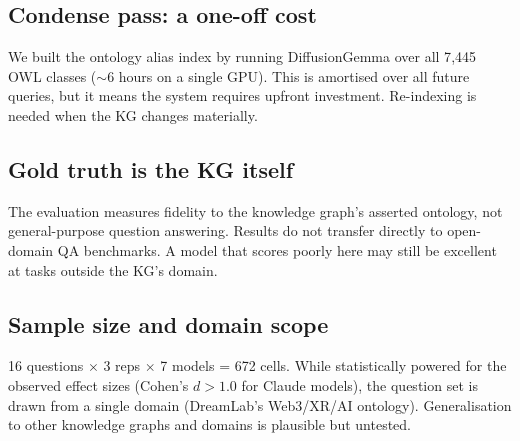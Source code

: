 \documentclass[11pt]{article}
\begin{document}
\begin{samepage}
\subsection{Condense pass: a one-off cost}
We built the ontology alias index by running DiffusionGemma over all 7{,}445 OWL classes
($\sim$6 hours on a single GPU). This is amortised over all future queries, but it means the
system requires upfront investment. Re-indexing is needed when the KG changes materially.
\end{samepage}

\begin{samepage}
\subsection{Gold truth is the KG itself}
The evaluation measures fidelity to the knowledge graph's asserted ontology, not general-purpose
question answering. Results do not transfer directly to open-domain QA benchmarks. A model that
scores poorly here may still be excellent at tasks outside the KG's domain.
\end{samepage}

\begin{samepage}
\subsection{Sample size and domain scope}
16 questions $\times$ 3 reps $\times$ 7 models = 672 cells. While statistically powered for the
observed effect sizes (Cohen's $d > 1.0$ for Claude models), the question set is drawn from a
single domain (DreamLab's Web3/XR/AI ontology). Generalisation to other knowledge graphs and
domains is plausible but untested.
\end{samepage}

\end{document}
